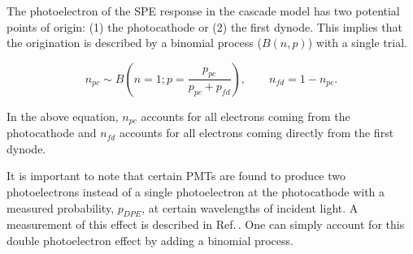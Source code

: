 \documentclass[11pt,a4paper]{article}
\newcommand\secref[1]{Section\,\ref{#1}}
\newcommand\citeref[1]{Ref.\,\cite{#1}}
\begin{document}




The photoelectron of the SPE response in the cascade model has two potential points of origin: (1) the photocathode or (2) the first dynode.  This implies that the origination is described by a binomial process ($B(n, p)$) with a single trial.

\begin{equation}
n_{pc} \sim B\left(n=1; p=\frac{p_{pc}}{p_{pc}+p_{fd}}\right), \qquad
n_{fd} = 1 - n_{pc}.
\end{equation}

In the above equation, $n_{pc}$ accounts for all electrons coming from the photocathode and $n_{fd}$ accounts for all electrons coming directly from the first dynode.



It is important to note that certain PMTs are found to produce two photoelectrons instead of a single photoelectron at the photocathode with a measured probability, $p_{DPE}$, at certain wavelengths of incident light.  A measurement of this effect is described in \citeref{dpe}.  One can simply account for this double photoelectron effect by adding a binomial process.
\end{document}
